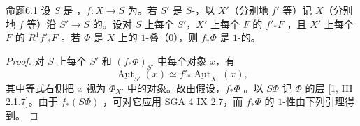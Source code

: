 \begin{SGAresult}{命题}{6.1}
设 $S$ 是 ，$f:X\to S$ 为。若 $S'$ 是 $S$-，以 $X'$（分别地 $f'$ 等）记 $X$（分别地 $f$ 等）沿 $S'\to S$ 的。设对 $S$ 上每个 $S'$，$X'$ 上每个 $F$ 的 $f'_*F$ ，且 $X'$ 上每个 $F$ 的 $R^1f'_*F$ 。若 $\Phi$ 是 $X$ 上的 $1$-叠（0），则 $f_*\Phi$ 是 $1$-的。
\end{SGAresult}
\begin{proof}
对 $S$ 上每个 $S'$ 和 $(f_*\Phi)_{S'}$ 中每个对象 $x$，有
\[\underline{\operatorname{Aut}}_{S'}(x)\simeq f'_*\underline{\operatorname{Aut}}_{X'}(x),\]
其中等式右侧把 $x$ 视为 $\Phi_{X'}$ 中的对象。故由假设，$f_*\Phi$ 。以 $S\Phi$ 记 $\Phi$ 的层 [1, III 2.1.7]。由于 $f_*(S\Phi)$ ，可对它应用 SGA 4 IX 2.7，而 $f_*\Phi$ 的 $1$-性由下列引理得到。
\end{proof}

